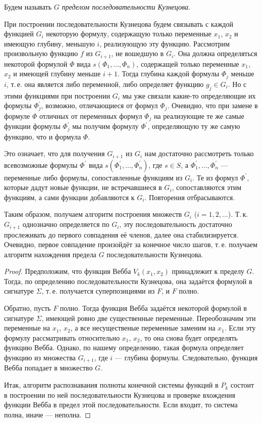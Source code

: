 \begin{definition}
    Будем называть $G$ \textit{пределом последовательности Кузнецова}.
\end{definition}

При построении последовательности Кузнецова будем связывать с каждой функцией $G_i$ некоторую формулу, содержащую только переменные $x_1$, $x_2$ и имеющую глубину, меньшую $i$, реализующую эту функцию. Рассмотрим произвольную функцию $f$ из $G_{i + 1}$, не вошедшую в $G_i$. Она должна определяться некоторой формулой $\Phi$ вида $s(\Phi_1, \ldots, \Phi_n)$, содержащей только переменные $x_1$, $x_2$ и имеющей глубину меньше $i + 1$. Тогда глубина каждой формулы $\Phi_j$ меньше $i$, т.\,е. она является либо переменной, либо определяет функцию $g_j \in G_i$. Но с этими функциями при построении $G_i$ мы уже связали какие-то определяющие их формулы $\Phi_j^\prime$, возможно, отличающиеся от формул $\Phi_j$. Очевидно, что при замене в формуле $\Phi$ отличных от переменных формул $\Phi_j$ на реализующие те же самые функции формулы $\Phi_j^\prime$ мы получим формулу $\Phi^\prime$, определяющую ту же самую функцию, что и формула $\Phi$.

Это означает, что для получения $G_{i + 1}$ из $G_i$ нам достаточно рассмотреть только всевозможные формулы $\Phi^\prime$ вида $s(\Phi_1^\prime, \ldots, \Phi_n^\prime)$, где $s \in S$, а $\Phi_1^\prime, \ldots, \Phi_n^\prime$ --- переменные либо формулы, сопоставленные функциям из $G_i$. Те из формул $\Phi^\prime$, которые дадут новые функции, не встречавшиеся в $G_i$, сопоставляются этим функциям, а сами функции добавляются к $G_i$. Повторения отбрасываются.

Таким образом, получаем алгоритм построения множеств $G_i$ ($i = 1, 2, \ldots$). Т.\,к. $G_{i + 1}$ однозначно определяется по $G_i$, эту последовательность достаточно прослеживать до первого совпадения её членов, далее она стабилизируется. Очевидно, первое совпадение произойдёт за конечное число шагов, т.\,е. получаем алгоритм нахождения предела $G$ последовательности Кузнецова.

\begin{proof}
    Предположим, что функция Вебба $V_k(x_1, x_2)$ принадлежит к пределу $G$. Тогда, по определению последовательности Кузнецова, она задаётся формулой в сигнатуре $\Sigma$, т.\,е. получается суперпозициями из $F$, и $F$ полно.

    Обратно, пусть $F$ полно. Тогда функция Вебба задаётся некоторой формулой в сигнатуре $\Sigma$, имеющей ровно две существенные переменные. Переобозначим эти переменные на $x_1$, $x_2$, а все несущественые переменные заменим на $x_1$. Если эту формулу рассматривать относительно $x_1$, $x_2$, то она снова будет определять функцию Вебба. Однако, по нашему определению, такая формула определяет функцию из множества $G_{i + 1}$, где $i$ --- глубина формулы. Следовательно, функция Вебба попадает в множество $G$.

    Итак, алгоритм распознавания полноты конечной системы функций в $P_k$ состоит в построении по ней последовательности Кузнецова и проверке вхождения функции Вебба в предел этой последовательности. Если входит, то система полна, иначе --- неполна.
\end{proof}

